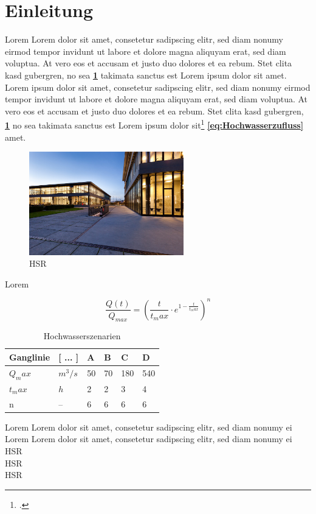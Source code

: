 \section{Einleitung}


Lorem Lorem dolor sit amet, consetetur sadipscing elitr, sed diam nonumy eirmod tempor invidunt ut labore et dolore magna aliquyam erat, sed diam voluptua. At vero eos et accusam et justo duo dolores et \autocite[22]{Roppel2006} ea rebum. Stet clita kasd gubergren, no sea \textbf{\ref{tab:Hochwasserszenarien}} takimata sanctus est Lorem ipsum dolor sit amet. Lorem ipsum dolor sit amet, consetetur sadipscing elitr, sed diam nonumy eirmod tempor invidunt ut labore et dolore magna aliquyam erat, sed diam voluptua. At vero eos et accusam et justo duo dolores et ea rebum. Stet clita kasd gubergren, \textbf{\ref{fig:HSR}} no sea takimata sanctus est Lorem ipsum dolor sit\footcite{Roppel2006} \textbf{\ref{eq:Hochwasserzufluss}} amet.

\begin{figure}[ht]
	\centering
	\includegraphics[width=0.6\textwidth]{images/HSR}
	\caption{\acs{HSR} \autocite{IR}}
	\label{fig:HSR}
\end{figure}

Lorem

 \begin{equation}\label{eq:Hochwasserzufluss}
\frac{Q(t)}{Q_{max}} = \left(\frac{t}{t_max}\cdot e^{1-\frac{t}{t_max}} \right)^n
\end{equation}

\begin{table}[ht]
	\begin{tabular}{|l|l|l|l|l|l|}
		\hline 
		\textbf{Ganglinie}	&\textbf{[ ... ]}  	& \textbf{A} 	 & \textbf{B}  	& \textbf{C} 	& \textbf{D}  \\ 
		\hline 
		$ Q_max $			& $ m^3/s $ 		& 50 			& 70		  	& 180			& 540 \\ 
		\hline 
		$ t_max $			& $ h $ 			& 2  			& 2 			& 3 			& 4 \\ 
		\hline 
		n					& --  				& 6  			& 6 			& 6 			& 6  \\ 
		\hline 
	\end{tabular} 
	\caption{Hochwasserszenarien}\label{tab:Hochwasserszenarien}
\end{table}

Lorem  Lorem dolor sit amet, consetetur sadipscing elitr, sed diam nonumy ei\\

Lorem  Lorem dolor sit amet, consetetur sadipscing elitr, sed diam nonumy ei \\
\ac{HSR}\\
\acs{HSR}\\
\acl{HSR}


\clearpage